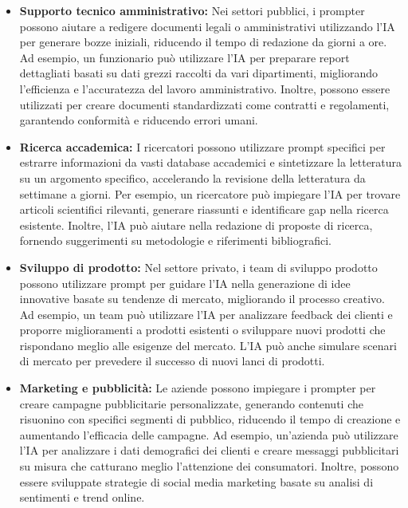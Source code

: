             \begin{itemize}
                \item \textbf{Supporto tecnico amministrativo:} Nei settori pubblici, i prompter possono aiutare a redigere documenti legali o amministrativi utilizzando l'IA per generare bozze iniziali, riducendo il tempo di redazione da giorni a ore. Ad esempio, un funzionario può utilizzare l'IA per preparare report dettagliati basati su dati grezzi raccolti da vari dipartimenti, migliorando l'efficienza e l'accuratezza del lavoro amministrativo. Inoltre, possono essere utilizzati per creare documenti standardizzati come contratti e regolamenti, garantendo conformità e riducendo errori umani.
                
                \item \textbf{Ricerca accademica:} I ricercatori possono utilizzare prompt specifici per estrarre informazioni da vasti database accademici e sintetizzare la letteratura su un argomento specifico, accelerando la revisione della letteratura da settimane a giorni. Per esempio, un ricercatore può impiegare l'IA per trovare articoli scientifici rilevanti, generare riassunti e identificare gap nella ricerca esistente. Inoltre, l'IA può aiutare nella redazione di proposte di ricerca, fornendo suggerimenti su metodologie e riferimenti bibliografici.
                
                \item \textbf{Sviluppo di prodotto:} Nel settore privato, i team di sviluppo prodotto possono utilizzare prompt per guidare l'IA nella generazione di idee innovative basate su tendenze di mercato, migliorando il processo creativo. Ad esempio, un team può utilizzare l'IA per analizzare feedback dei clienti e proporre miglioramenti a prodotti esistenti o sviluppare nuovi prodotti che rispondano meglio alle esigenze del mercato. L'IA può anche simulare scenari di mercato per prevedere il successo di nuovi lanci di prodotti.
                
                \item \textbf{Marketing e pubblicità:} Le aziende possono impiegare i prompter per creare campagne pubblicitarie personalizzate, generando contenuti che risuonino con specifici segmenti di pubblico, riducendo il tempo di creazione e aumentando l'efficacia delle campagne. Ad esempio, un'azienda può utilizzare l'IA per analizzare i dati demografici dei clienti e creare messaggi pubblicitari su misura che catturano meglio l'attenzione dei consumatori. Inoltre, possono essere sviluppate strategie di social media marketing basate su analisi di sentimenti e trend online.
                

\end{itemize}
